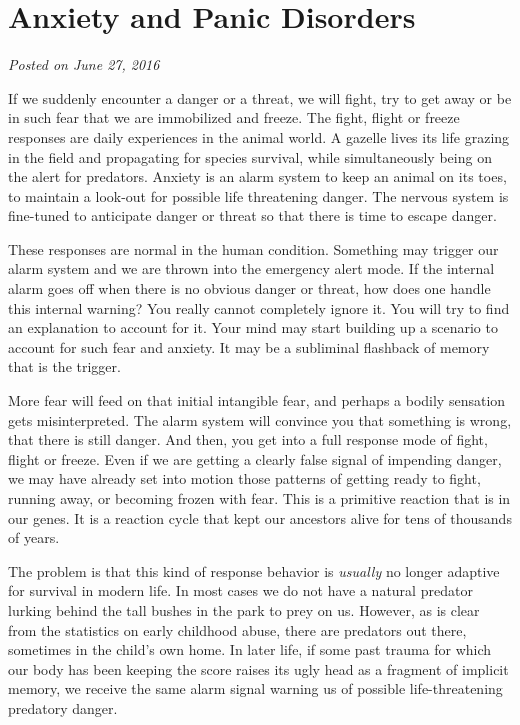 \documentclass[]{book}
\begin{document}
\hypertarget{anxiety-and-panic-disorders}{%
\section{Anxiety and Panic Disorders}\label{anxiety-and-panic-disorders}}

\emph{Posted on June 27, 2016}

If we suddenly encounter a danger or a threat, we will fight, try to get away or be in such fear that we are immobilized and freeze. The fight, flight or freeze responses are daily experiences in the animal world. A gazelle lives its life grazing in the field and propagating for species survival, while simultaneously being on the alert for predators. Anxiety is an alarm system to keep an animal on its toes, to maintain a look-out for possible life threatening danger. The nervous system is fine-tuned to anticipate danger or threat so that there is time to escape danger.

These responses are normal in the human condition. Something may trigger our alarm system and we are thrown into the emergency alert mode. If the internal alarm goes off when there is no obvious danger or threat, how does one handle this internal warning? You really cannot completely ignore it. You will try to find an explanation to account for it. Your mind may start building up a scenario to account for such fear and anxiety. It may be a subliminal flashback of memory that is the trigger.

More fear will feed on that initial intangible fear, and perhaps a bodily sensation gets misinterpreted. The alarm system will convince you that something is wrong, that there is still danger. And then, you get into a full response mode of fight, flight or freeze. Even if we are getting a clearly false signal of impending danger, we may have already set into motion those patterns of getting ready to fight, running away, or becoming frozen with fear. This is a primitive reaction that is in our genes. It is a reaction cycle that kept our ancestors alive for tens of thousands of years.

The problem is that this kind of response behavior is \emph{usually} no longer adaptive for survival in modern life. In most cases we do not have a natural predator lurking behind the tall bushes in the park to prey on us. However, as is clear from the statistics on early childhood abuse, there are predators out there, sometimes in the child's own home. In later life, if some past trauma for which our body has been keeping the score raises its ugly head as a fragment of implicit memory, we receive the same alarm signal warning us of possible life-threatening predatory danger.
\end{document}
